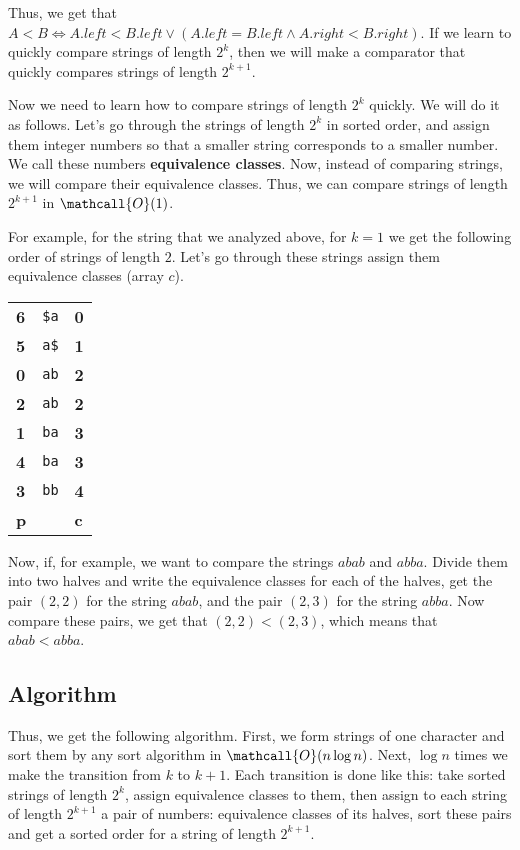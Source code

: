 \documentclass[11pt]{article}
\begin{document}
Thus, we get that \(A < B \iff A.left < B.left \lor (A.left = B.left \land A.right < B.right)\). If we
learn to quickly compare strings of length \(2^k\), then we will make a comparator that quickly
compares strings of length \(2^{k + 1}\).

Now we need to learn how to compare strings of length \(2^k\) quickly. We will do it as
follows. Let's go through the strings of length \(2^k\) in sorted order, and assign them integer
numbers so that a smaller string corresponds to a smaller number. We call these numbers
\textbf{equivalence classes}. Now, instead of comparing strings, we will compare their equivalence
classes. Thus, we can compare strings of length \(2^{k + 1}\) in \(\mathcall{O}(1)\).

For example, for the string that we analyzed above, for \(k = 1\) we get the following order of
strings of length \(2\). Let's go through these strings assign them equivalence classes (array
\(c\)).

\begin{center}
\begin{tabular}{lll}
\textbf{6} & \texttt{\$a} & \textbf{0}\\
\textbf{5} & \texttt{a\$} & \textbf{1}\\
\textbf{0} & \texttt{ab} & \textbf{2}\\
\textbf{2} & \texttt{ab} & \textbf{2}\\
\textbf{1} & \texttt{ba} & \textbf{3}\\
\textbf{4} & \texttt{ba} & \textbf{3}\\
\textbf{3} & \texttt{bb} & \textbf{4}\\
\textbf{p} &  & \textbf{c}\\
\end{tabular}
\end{center}

Now, if, for example, we want to compare the strings \(abab\) and \(abba\). Divide them into two
halves and write the equivalence classes for each of the halves, get the pair \((2, 2)\) for the
string \(abab\), and the pair \((2, 3)\) for the string \(abba\). Now compare these pairs, we get that
\((2, 2) < (2, 3)\), which means that \(abab < abba\).

\subsection{Algorithm}
\label{sec:org3e46588}
Thus, we get the following algorithm. First, we form strings of one character and sort them by
any sort algorithm in \(\mathcall{O}(n \log n)\). Next, \(\log n\) times we make the transition from
\(k\) to \(k + 1\). Each transition is done like this: take sorted strings of length \(2^k\), assign
equivalence classes to them, then assign to each string of length \(2^{k + 1}\) a pair of numbers:
equivalence classes of its halves, sort these pairs and get a sorted order for a string of length
\(2^{k + 1}\).
\end{document}
